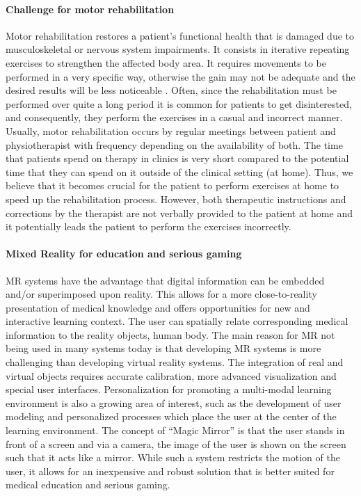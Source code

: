 \paragraph{Challenge for motor rehabilitation}
Motor rehabilitation restores a patient's functional health that is damaged due to musculoskeletal or nervous system impairments. It consists in iterative repeating exercises to strengthen the affected body area. It requires movements to be performed in a very specific way, otherwise the gain may not be adequate and the desired results will be less noticeable \cite{Merians2006,Ustinova2014}. Often, since the rehabilitation must be performed over quite a long period it is common for patients to get disinterested, and consequently, they perform the exercises in a casual and incorrect manner. Usually, motor rehabilitation occurs by regular meetings between patient and physiotherapist with frequency depending on the availability of both. The time that patients spend on therapy in clinics is very short compared to the potential time that they can spend on it outside of the clinical setting (\eg at home). Thus, we believe that it becomes crucial for the patient to perform exercises at home to speed up the rehabilitation process. However, both therapeutic instructions and corrections by the therapist are not verbally provided to the patient at home and it potentially leads the patient to perform the exercises incorrectly.

\paragraph{Mixed Reality for education and serious gaming}
MR systems have the advantage that digital information can be embedded and/or superimposed upon reality. This allows for a more close-to-reality presentation of medical knowledge and offers opportunities for new and interactive learning context. 
The user can spatially relate corresponding medical information to the reality objects, \eg human body. 
The main reason for MR not being used in many systems today is that developing MR systems is more challenging than developing virtual reality systems. 
The integration of real and virtual objects requires accurate calibration, more advanced visualization and special user interfaces.
Personalization for promoting a multi-modal learning environment is also a growing area of interest, such as the development of user modeling and personalized processes which place the user at the center of the learning environment.
The concept of ``Magic Mirror'' is that the user stands in front of a screen and via a camera, the image of the user is shown on the screen such that it acts like a mirror. While such a system restricts the motion of the user, it allows for an inexpensive and robust solution that is better suited for medical education and serious gaming.  

